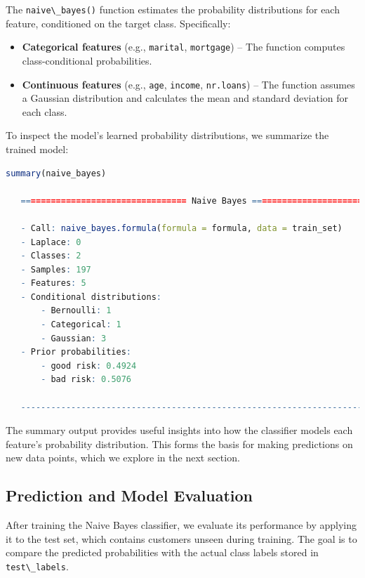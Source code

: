 \documentclass[
  11pt,
]{book}
\newcommand{\passthrough}[1]{#1}
\providecommand{\tightlist}{%
  \setlength{\itemsep}{0pt}\setlength{\parskip}{0pt}}
\theoremstyle{definition}
\theoremstyle{definition}
\theoremstyle{definition}
\theoremstyle{definition}
\theoremstyle{remark}
\begin{document}
The \passthrough{\lstinline!naive\_bayes()!} function estimates the probability distributions for each feature, conditioned on the target class. Specifically:

\begin{itemize}
\tightlist
\item
  \textbf{Categorical features} (e.g., \passthrough{\lstinline!marital!}, \passthrough{\lstinline!mortgage!}) -- The function computes class-conditional probabilities.\\
\item
  \textbf{Continuous features} (e.g., \passthrough{\lstinline!age!}, \passthrough{\lstinline!income!}, \passthrough{\lstinline!nr.loans!}) -- The function assumes a Gaussian distribution and calculates the mean and standard deviation for each class.
\end{itemize}

To inspect the model's learned probability distributions, we summarize the trained model:

\begin{lstlisting}[language=R]
summary(naive_bayes)
   
   ================================= Naive Bayes ================================== 
    
   - Call: naive_bayes.formula(formula = formula, data = train_set) 
   - Laplace: 0 
   - Classes: 2 
   - Samples: 197 
   - Features: 5 
   - Conditional distributions: 
       - Bernoulli: 1
       - Categorical: 1
       - Gaussian: 3
   - Prior probabilities: 
       - good risk: 0.4924
       - bad risk: 0.5076
   
   --------------------------------------------------------------------------------
\end{lstlisting}

The summary output provides useful insights into how the classifier models each feature's probability distribution. This forms the basis for making predictions on new data points, which we explore in the next section.

\subsection*{Prediction and Model Evaluation}\label{prediction-and-model-evaluation}


After training the Naive Bayes classifier, we evaluate its performance by applying it to the test set, which contains customers unseen during training. The goal is to compare the predicted probabilities with the actual class labels stored in \passthrough{\lstinline!test\_labels!}.
\end{document}

